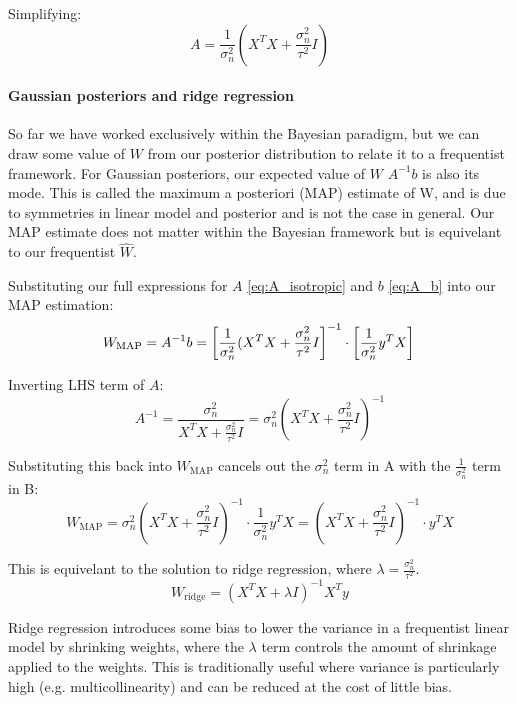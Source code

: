 Simplifying:
\begin{equation} \label{eq:A_isotropic}
A = \frac{1}{\sigma_n^2}\left(X^TX + \frac{\sigma_n^2}{\tau^2}I\right)
\end{equation}

\paragraph{Gaussian posteriors and ridge regression}
So far we have worked exclusively within the Bayesian paradigm, but we can draw some value of $W$ from our posterior distribution to relate it to a frequentist framework. For Gaussian posteriors, our expected value of $W$ $A^{-1}b$ is also its mode. This is called the maximum a posteriori (MAP) estimate of W, and is due to symmetries in linear model and posterior and is not the case in general.  Our MAP estimate does not matter within the Bayesian framework but is equivelant to our frequentist $\hat{W}$.

Substituting our full expressions for $A$ \ref{eq:A_isotropic} and $b$ \ref{eq:A_b} into our MAP estimation:
\begin{equation*} 
    W_{\text{MAP}} = A^{-1}b = \left[\frac{1}{\sigma_n^2}(X^TX + \frac{\sigma_n^2}{\tau^2}I\right]^{-1} \cdot \left[\frac{1}{\sigma_n^2}y^TX\right] \\
\end{equation*}

Inverting LHS term of $A$:
\begin{equation*}
    A^{-1} = \frac{\sigma_n^2}{X^TX + \frac{\sigma_n^2}{\tau^2}I} = \sigma_n^2\left(X^TX + \frac{\sigma_n^2}{\tau^2}I\right)^{-1}
\end{equation*}

Substituting this back into $W_\text{MAP}$ cancels out the $\sigma_n^2$ term in A with the $\frac{1}{\sigma_n^2}$ term in B:
\begin{equation*}
    W_{\text{MAP}} = \sigma_n^2\left(X^TX + \frac{\sigma_n^2}{\tau^2}I\right)^{-1} \cdot \frac{1}{\sigma_n^2}y^TX = \left(X^TX + \frac{\sigma_n^2}{\tau^2}I\right)^{-1} \cdot y^TX
\end{equation*}

This is equivelant to the solution to ridge regression, where $\lambda = \frac{\sigma_n^2}{\tau^2}$.
\begin{equation*}
    W_{\text{ridge}} = \left(X^TX + \lambda I\right)^{-1}X^Ty
\end{equation*}

Ridge regression introduces some bias to lower the variance in a frequentist linear model by shrinking weights, where the $\lambda$ term controls the amount of shrinkage applied to the weights. This is traditionally useful where variance is particularly high (e.g. multicollinearity) and can be reduced at the cost of little bias.  

